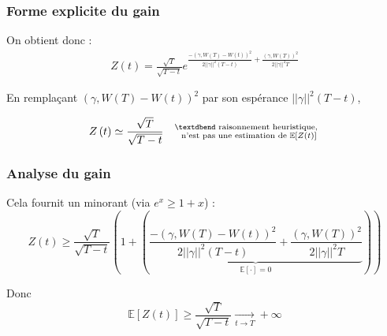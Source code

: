 \documentclass{beamer}
\begin{document}
\begin{frame}
\frametitle{Forme explicite du gain}
\par On obtient donc :
\begin{displaymath}
	\begin{split}
		\boxed{
	Z \left( t \right) = \frac{\sqrt{T}}{\sqrt{T - t}} e^{\frac{- \left( \gamma, W \left( T \right) - W \left( t \right) \right)^2}{2 ||\gamma||^2 \left( T - t \right)} + \frac{\left( \gamma, W \left( T \right) \right)^2}{2 ||\gamma||^2 T }}
		}
	\end{split}
\end{displaymath}
\par En remplaçant $ \left( \gamma, W \left( T \right) - W \left( t \right) \right)^2 $ par son espérance $||\gamma||^2 \left( T - t \right)  $,

\begin{displaymath}
	Z \left( t \right) \simeq \frac{\sqrt{T}}{\sqrt{T - t}} \quad \substack{\text{\textdbend raisonnement heuristique, } \\ \text{ n'est pas une estimation de } \mathbb{E} \left[ Z \left( t \right) \right]}
\end{displaymath}

\end{frame}

\begin{frame}
\frametitle{Analyse du gain}

\par Cela fournit un minorant (via $e^x \geq 1 + x$) :
\begin{displaymath}
Z \left( t \right) \geq  \frac{\sqrt{T}}{\sqrt{T - t}} \left( 1 + \left( \underbrace{\frac{- \left( \gamma, W \left( T \right) - W \left( t \right) \right)^2}{2 ||\gamma||^2 \left( T - t \right)} + \frac{\left( \gamma, W \left( T \right) \right)^2}{2 ||\gamma||^2 T }}_{\mathbb{E} \left[ \cdot \right] = 0} \right) \right)
\end{displaymath}

\par Donc
\begin{displaymath}
\mathbb{E} \left[ Z \left( t \right) \right] \geq  \frac{\sqrt{T}}{\sqrt{T - t}} \xrightarrow[t \to T]{} + \infty
\end{displaymath}
\end{frame}
\end{document}

